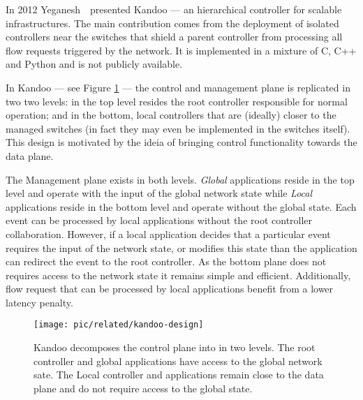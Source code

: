 In 2012 Yeganesh~\etal\ presented Kandoo \cite{Yeganeh:2012jm}  --- an hierarchical controller for scalable infrastructures. 
The main contribution comes from the deployment of isolated controllers near the switches that shield a parent  controller from processing all
flow requests triggered by the network. 
It is implemented in a mixture of
C, C++ and Python and is not publicly available. 

In Kandoo --- see Figure  \ref{fig:kandoo-design} --- the control and management plane is replicated in two two levels: in the top level resides the root controller responsible for normal operation; and in the bottom, local controllers that are (ideally) closer to the managed switches (in fact they may even be implemented in the switches itself). 
This design is motivated by the ideia of bringing control functionality towards the data plane. 


The Management plane exists in both levels. 
\emph{Global} applications reside in the top level and operate with the input of the global network state while \emph{Local} applications reside in the bottom level and operate without the global state. 
Each event can be processed by local applications without the root controller collaboration. 
However, if a local application decides that a particular event requires the input of the network state, or modifies this state than the application can redirect the event to the root controller. 
As the bottom plane does not requires access to the network state it remains simple and efficient. 
Additionally, flow request that can be processed by local applications benefit from a lower latency penalty. 


\begin{figure}
  \centering 
\texttt{[image: pic/related/kandoo-design]}
  \caption[Kandoo design] {Kandoo decomposes the control plane into 
in two levels. The root controller and global applications have access to the global network sate.  The Local controller and applications remain close to the data plane and do not require access to the global state.} 
  \label{fig:kandoo-design}
\end{figure}




